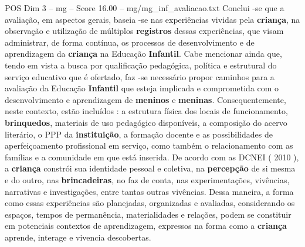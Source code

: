 \begin{textsample}{POS Dim 3 – mg – Score 16.00 – mg/mg\_inf\_avaliacao.txt}
Conclui -se que a avaliação, em aspectos gerais, baseia -se nas experiências vividas pela \textbf{criança}, na observação e utilização de múltiplos \textbf{registros} dessas experiências, que visam administrar, de forma contínua, os processos de desenvolvimento e de aprendizagem da \textbf{criança} na Educação \textbf{Infantil}.
Cabe mencionar ainda que, tendo em vista a busca por qualificação pedagógica, política e estrutural do serviço educativo que é ofertado, faz -se necessário propor caminhos para a avaliação da Educação \textbf{Infantil} que esteja implicada e comprometida com o desenvolvimento e aprendizagem de \textbf{meninos} e \textbf{meninas}.
Consequentemente, neste contexto, estão incluídos : a estrutura física dos locais de funcionamento, \textbf{brinquedos}, materiais de uso pedagógico disponíveis, a composição do acervo literário, o PPP da \textbf{instituição}, a formação docente e as possibilidades de aperfeiçoamento profissional em serviço, como também o relacionamento com as famílias e a comunidade em que está inserida.
De acordo com as DCNEI ( 2010 ), a \textbf{criança} constrói sua identidade pessoal e coletiva, na \textbf{percepção} de si mesma e do outro, nas \textbf{brincadeiras}, no faz de conta, nas experimentações, vivências, narrativas e investigações, entre tantas outras vivências.
Dessa maneira, a forma como essas experiências são planejadas, organizadas e avaliadas, considerando os espaços, tempos de permanência, materialidades e relações, podem se constituir em potenciais contextos de aprendizagem, expressos na forma como a \textbf{criança} aprende, interage e vivencia descobertas.

\end{textsample}
